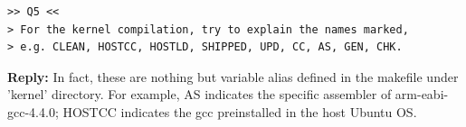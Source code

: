 \documentclass[10pt,journal,draftclsnofoot,onecolumn]{IEEEtran}
\begin{document}
\begin{verbatim}
>> Q5 <<
> For the kernel compilation, try to explain the names marked, 
> e.g. CLEAN, HOSTCC, HOSTLD, SHIPPED, UPD, CC, AS, GEN, CHK.
\end{verbatim}
\textbf{Reply:} In fact, these are nothing but variable alias defined in the makefile under 'kernel' directory.
For example, AS indicates the specific assembler of arm-eabi-gcc-4.4.0; HOSTCC indicates the gcc preinstalled
in the host Ubuntu OS. 


%
%
\clearpage
\end{document}
